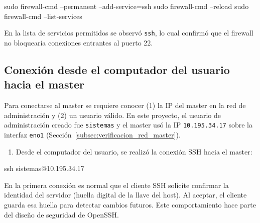 \begin{terminalblock}
sudo firewall-cmd --permanent --add-service=ssh
sudo firewall-cmd --reload
sudo firewall-cmd --list-services
\end{terminalblock}


En la lista de servicios permitidos se observó \texttt{ssh}, lo cual confirmó que el firewall no bloquearía conexiones entrantes al puerto 22.

\subsection{Conexión desde el computador del usuario hacia el master}
Para conectarse al master se requiere conocer (1) la IP del master en la red de administración y (2) un usuario válido. En este proyecto, el usuario de administración creado fue \texttt{sistemas} y el master usó la IP \texttt{10.195.34.17} sobre la interfaz \texttt{eno1} (Sección~\ref{subsec:verificacion_red_master}). 

\begin{enumerate}
  \item Desde el computador del usuario, se realizó la conexión SSH hacia el master:
\end{enumerate}

\begin{terminalblock}
ssh sistemas@10.195.34.17
\end{terminalblock}


En la primera conexión es normal que el cliente SSH solicite confirmar la identidad del servidor (huella digital de la llave del host). Al aceptar, el cliente guarda esa huella para detectar cambios futuros. Este comportamiento hace parte del diseño de seguridad de OpenSSH. \cite{openssh_manual}

